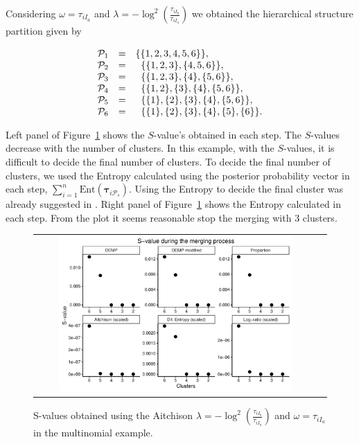 \documentclass[submit]{smj}
\theoremstyle{definition}
\newcommand{\m}[1]{\boldsymbol{#1}}
\begin{document}
Considering $\omega = \tau_{i I_a}$ and $\lambda = -\log^2 \left(\frac{ \tau_{iI_b} }{ \tau_{iI_a} }\right)$ we obtained the hierarchical structure partition given by


\begin{equation}
\begin{array}{r c l}
 \mathcal{P}_1&=& \{\{1,2,3,4,5,6\}\}, \\ 
 \mathcal{P}_2&=& \;\; \{\{1,2,3\},\{4,5,6\}\}, \\ 
 \mathcal{P}_3&=& \;\; \{\{1,2,3\},\{4\},\{5,6\}\}, \\ 
 \mathcal{P}_4&=& \;\; \{\{1,2\},\{3\},\{4\},\{5,6\}\}, \\ 
 \mathcal{P}_5&=& \;\; \{\{1\},\{2\},\{3\},\{4\},\{5,6\}\}, \\ 
 \mathcal{P}_6&=& \;\; \{\{1\},\{2\},\{3\},\{4\},\{5\},\{6\}\}.
\end{array}
\label{hier_ex_multinomial}
\end{equation}

Left panel of Figure~\ref{multinomial_Svalues} shows the $S$-value's obtained in each step. The $S$-values decrease with the number of clusters. In this example, with the $S$-values, it is difficult to decide the final number of clusters. To decide the final number of clusters, we used the Entropy calculated using the posterior probability vector in each step, $\sum_{i=1}^n\text{Ent}(\m\tau_{i\mathcal{P}_s})$. Using the Entropy to decide the final cluster was already suggested in \cite{baudry2010combining}. Right panel of Figure~\ref{multinomial_Svalues} shows the Entropy calculated in each step. From the plot it seems reasonable stop the merging with 3 clusters. 

\begin{figure}[t]
\begin{center}
\begin{tabular}{cc}
  \includegraphics[width=0.85\textwidth]{figures/multinomial_Svalues_all.pdf} \\
 \end{tabular}
 \caption{S-values obtained using the Aitchison $\lambda = -\log^2 \left(\frac{ \tau_{iI_b} }{ \tau_{iI_a} }\right)$ and $\omega = \tau_{i I_a}$ in the multinomial example.}\label{multinomial_Svalues}
\end{center}
\end{figure}
\end{document}
